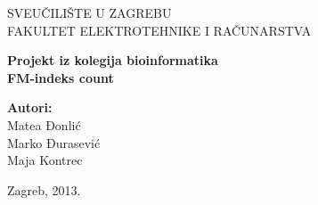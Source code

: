 \begin{titlepage}

\begin{center}
	
	{\large SVEUČILIŠTE U ZAGREBU\\FAKULTET ELEKTROTEHNIKE I RAČUNARSTVA}
	
	\vfill

	\textbf{ \large Projekt iz kolegija bioinformatika} \\


	\vspace{20pt}
	\textbf{\huge FM-indeks count}
	\vspace{40pt}
	
	\bigskip
	
	\begin{minipage}{1.0\textwidth}
	\begin{center} 
	\textbf{Autori:}\\
	Matea Đonlić  \\
	Marko Đurasević \\
	Maja Kontrec \\

	
	\end{center}
	\end{minipage}
	\vfill

	{\large Zagreb, 2013.}
	
\end{center}

\end{titlepage}